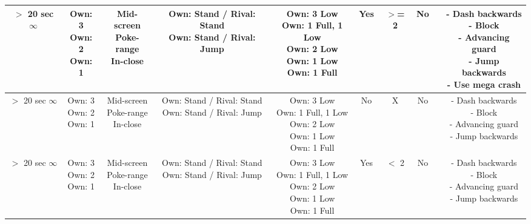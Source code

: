 \documentclass{article}
\begin{document}
\begin{landscape}
\begin{table}[h!]
\begin{center}
\begin{tabular*}{27cm}{c|c|c|c|c|c|c|c|c|c}
      \hline
      \makecell{$>$ 20 sec \\ $\infty$} & \makecell{Own: 3 \\ Own: 2 \\ Own: 1} & \makecell{Mid-screen \\ Poke-range \\ In-close} & \makecell{Own: Stand / Rival: Stand \\ Own: Stand / Rival: Jump} & \makecell{Own: 3 Low \\ Own: 1 Full, 1 Low \\ Own: 2 Low \\ Own: 1 Low \\ Own: 1 Full} & Yes & $>$= 2 & No & & \makecell{- Dash backwards \\ - Block \\ - Advancing guard \\ - Jump backwards \\ - Use mega crash}\\
      \hline
      \makecell{$>$ 20 sec \\ $\infty$} & \makecell{Own: 3 \\ Own: 2 \\ Own: 1} & \makecell{Mid-screen \\ Poke-range \\ In-close} & \makecell{Own: Stand / Rival: Stand \\ Own: Stand / Rival: Jump} & \makecell{Own: 3 Low \\ Own: 1 Full, 1 Low \\ Own: 2 Low \\ Own: 1 Low \\ Own: 1 Full} & No & X & No & & \makecell{- Dash backwards \\ - Block \\ - Advancing guard \\ - Jump backwards}\\
      \hline
      \makecell{$>$ 20 sec \\ $\infty$} & \makecell{Own: 3 \\ Own: 2 \\ Own: 1} & \makecell{Mid-screen \\ Poke-range \\ In-close} & \makecell{Own: Stand / Rival: Stand \\ Own: Stand / Rival: Jump} & \makecell{Own: 3 Low \\ Own: 1 Full, 1 Low \\ Own: 2 Low \\ Own: 1 Low \\ Own: 1 Full} & Yes & $<$ 2 & No & & \makecell{- Dash backwards \\ - Block \\ - Advancing guard \\ - Jump backwards}\\

\end{tabular*}
\end{center}
\end{table}
\end{landscape}
\end{document}
